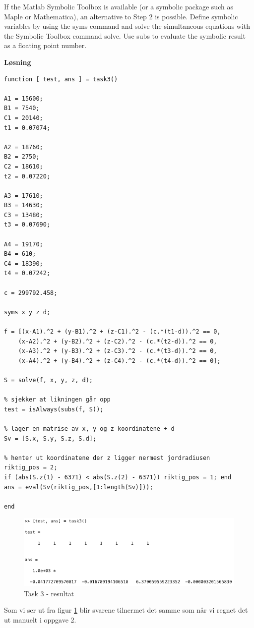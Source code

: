 % 

If the Matlab Symbolic Toolbox is available (or a symbolic package such as Maple
or Mathematica), an alternative to Step 2 is possible. Define symbolic variables by using the syms command and solve the simultaneous equations with the Symbolic Toolbox command solve. Use subs to evaluate the symbolic result as a floating point number.

\vspace{5mm}

\textbf{Løsning}


\begin{lstlisting}[caption={Task3.m}]
function [ test, ans ] = task3()

A1 = 15600;
B1 = 7540;
C1 = 20140;
t1 = 0.07074;

A2 = 18760;
B2 = 2750;
C2 = 18610;
t2 = 0.07220;

A3 = 17610;
B3 = 14630;
C3 = 13480;
t3 = 0.07690;

A4 = 19170;
B4 = 610;
C4 = 18390;
t4 = 0.07242;

c = 299792.458;

syms x y z d;

f = [(x-A1).^2 + (y-B1).^2 + (z-C1).^2 - (c.*(t1-d)).^2 == 0,
    (x-A2).^2 + (y-B2).^2 + (z-C2).^2 - (c.*(t2-d)).^2 == 0, 
    (x-A3).^2 + (y-B3).^2 + (z-C3).^2 - (c.*(t3-d)).^2 == 0, 
    (x-A4).^2 + (y-B4).^2 + (z-C4).^2 - (c.*(t4-d)).^2 == 0];

S = solve(f, x, y, z, d);

% sjekker at likningen går opp
test = isAlways(subs(f, S));

% lager en matrise av x, y og z koordinatene + d
Sv = [S.x, S.y, S.z, S.d];

% henter ut koordinatene der z ligger nermest jordradiusen
riktig_pos = 2;
if (abs(S.z(1) - 6371) < abs(S.z(2) - 6371)) riktig_pos = 1; end
ans = eval(Sv(riktig_pos,[1:length(Sv)]));

end
\end{lstlisting}

\begin{figure}[h]
    \centering
    \includegraphics[width=1\textwidth]{sections/Exercise3/task3result}
    \caption{Task 3 - resultat}
    \label{fig:task3result}
\end{figure}

Som vi ser ut fra figur \ref{fig:task3result} blir svarene tilnermet det samme som når vi regnet det ut manuelt i oppgave 2.

% 